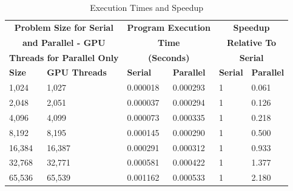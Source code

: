 \documentclass{article}
\begin{document}
\begin{table}[ht]
\centering
\caption{Execution Times and Speedup} %
\label{table:nonlin} %
\begin{tabular}{|p{}|p{}|p{}|p{}|p{}|p{}|} 
 \hline
 \multicolumn{2}{|c|}{\small\textbf{Problem Size for Serial}} & \multicolumn{2}{|c|}{\small\textbf{Program Execution}} & \multicolumn{2}{|c|}{\small\textbf{Speedup}}\\
 \multicolumn{2}{|c|}{\small\textbf{and Parallel - GPU}} & \multicolumn{2}{|c|}{\small\textbf{Time}} & \multicolumn{2}{|c|}{\small\textbf{Relative To}}\\
 \multicolumn{2}{|c|}{\small\textbf{Threads for Parallel Only}} & \multicolumn{2}{|c|}{\small\textbf{(Seconds)}} & \multicolumn{2}{|c|}{\small\textbf{Serial}}\\
 \hline
 {\small\textbf{Size}} & {\small\textbf{GPU Threads}} & {\small\textbf{Serial}} & {\small\textbf{Parallel}} & {\small\textbf{Serial}} & {\small\textbf{Parallel}}\\

 \hline
 {1,024} & {1,027} & {0.000018} & {0.000293} & {1} & {0.061}\\
 \hline
 {2,048} & {2,051} & {0.000037} & {0.000294} & {1} & {0.126}\\
 \hline
 {4,096} & {4,099} & {0.000073} & {0.000335} & {1} & {0.218}\\
 \hline
 {8,192} & {8,195} & {0.000145} & {0.000290} & {1} & {0.500}\\
 \hline
 {16,384} & {16,387} & {0.000291} & {0.000312} & {1} & {0.933}\\
 \hline
 {32,768} & {32,771} & {0.000581} & {0.000422} & {1} & {1.377}\\
 \hline
 {65,536} & {65,539} & {0.001162} & {0.000533} & {1} & {2.180}\\
 \hline
\end{tabular}
\end{table}
\end{document}
